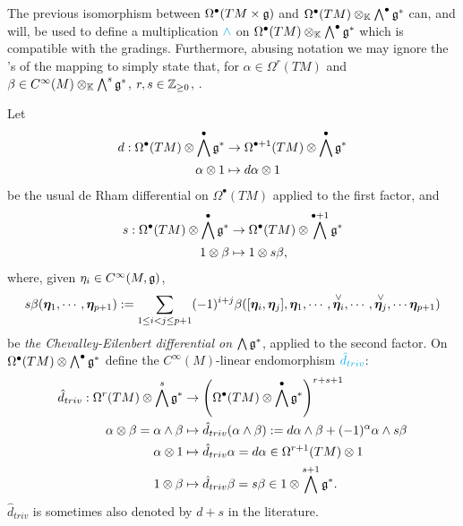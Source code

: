 \begin{remark}
The previous isomorphism between $\Omega^\bullet(TM \times \mathfrak{g})$ and $\Omega^\bullet(TM) \otimes_{\mathbb{K}} \bigwedge^\bullet \mathfrak{g}^*$ can, and will, be used to define a multiplication $\textcolor{cyan}{\wedge}$ on $\Omega^\bullet(TM) \otimes_{\mathbb{K}} \bigwedge^\bullet \mathfrak{g}^*$ which is compatible with the gradings. 
Furthermore, abusing notation we may ignore the $~$'s of the mapping to simply state that, for $\alpha \in \Omega^r(TM)$ and $\beta \in C^\infty(M)\otimes_{\mathbb{K}} \bigwedge^s \mathfrak{g}^*$, $r, s \in \mathbb{Z}_{\geq 0}$, . 
\end{remark}

\begin{definition}
Let
\begin{align}
    d: \Omega^\bullet(TM) \otimes \bigwedge^\bullet \mathfrak{g}^* &\to \Omega^{\bullet+1}(TM) \otimes \bigwedge^\bullet \mathfrak{g}^*\\
    \alpha \otimes 1 &\mapsto d\alpha \otimes 1
\end{align}
be the usual de Rham differential on $\Omega^\bullet(TM)$ applied to the first factor, and
\begin{align*}
    s: \Omega^\bullet(TM) \otimes \bigwedge^\bullet \mathfrak{g}^* &\to \Omega^\bullet(TM) \otimes \bigwedge^{\bullet+1} \mathfrak{g}^* \\
    1 \otimes \beta &\mapsto 1 \otimes s\beta, 
\end{align*} where, given $\eta_i \in C^\infty(M, \mathfrak{g})$,
\begin{multline}
    s\beta(\bm{\eta}_1, \cdots, \bm{\eta}_{p+1}) := \sum_{1 \leq i < j \leq p+1} (-1)^{i+j} \beta([\bm{\eta}_i, \bm{\eta}_j], \bm{\eta}_1, \cdots, \overset{\vee}{\bm{\eta}_i}, \cdots, \overset{\vee}{\bm{\eta}_j}, \cdots \bm{\eta}_{p+1})
\end{multline}
be \emph{the Chevalley-Eilenbert differential on $\bigwedge \mathfrak{g}^*$}, applied to the second factor. On $\Omega^\bullet(TM) \otimes \bigwedge^\bullet \mathfrak{g}^*$ define the $C^\infty(M)$-linear endomorphism $\textcolor{cyan}{\hat d_{triv}}$:
\begin{align}
    \hat d_{triv}: \Omega^r(TM) \otimes \bigwedge^s \mathfrak{g}^* &\to \left( \Omega^\bullet(TM) \otimes \bigwedge^\bullet \mathfrak{g}^*\right)^{r+s+1} \\
    \alpha \otimes \beta = \alpha \wedge \beta &\mapsto  \hat d_{triv} (\alpha \wedge \beta) := d\alpha \wedge \beta + (-1)^\alpha \alpha \wedge s\beta \\
    \alpha \otimes 1 &\mapsto \hat d_{triv}\alpha = d\alpha \in \Omega^{r+1}(TM) \otimes 1 \\
    1 \otimes \beta &\mapsto \hat d_{triv}\beta = s\beta \in 1 \otimes \bigwedge^{s+1} \mathfrak{g}^*.
\end{align} $\hat d_{triv}$ is sometimes also denoted by $d+s$ in the literature.

\end{definition}

